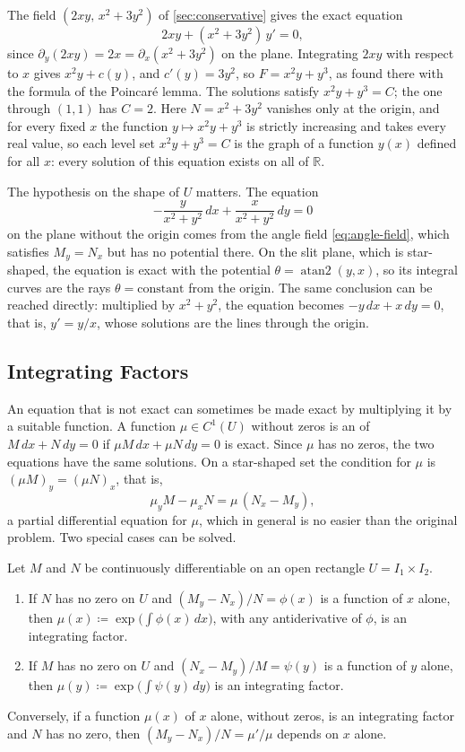 The field $(2xy,\,x^2+3y^2)$ of \cref{sec:conservative} gives the exact equation
\[
2xy+(x^2+3y^2)\,y'=0 ,
\]
since $\partial_y(2xy)=2x=\partial_x(x^2+3y^2)$ on the plane. Integrating $2xy$ with respect to $x$ gives $x^2y+c(y)$, and $c'(y)=3y^2$, so $F=x^2y+y^3$, as found there with the formula of the Poincar\'e lemma. The solutions satisfy $x^2y+y^3=C$; the one through $(1,1)$ has $C=2$. Here $N=x^2+3y^2$ vanishes only at the origin, and for every fixed $x$ the function $y\mapsto x^2y+y^3$ is strictly increasing and takes every real value, so each level set $x^2y+y^3=C$ is the graph of a function $y(x)$ defined for all $x$: every solution of this equation exists on all of $\mathbb R$.

The hypothesis on the shape of $U$ matters. The equation
\[
-\frac y{x^2+y^2}\,dx+\frac x{x^2+y^2}\,dy=0
\]
on the plane without the origin comes from the angle field \eqref{eq:angle-field}, which satisfies $M_y=N_x$ but has no potential there. On the slit plane, which is star-shaped, the equation is exact with the potential $\theta=\operatorname{atan2}(y,x)$, so its integral curves are the rays $\theta=\text{constant}$ from the origin. The same conclusion can be reached directly: multiplied by $x^2+y^2$, the equation becomes $-y\,dx+x\,dy=0$, that is, $y'=y/x$, whose solutions are the lines through the origin.

\subsection{Integrating Factors}

An equation that is not exact can sometimes be made exact by multiplying it by a suitable function. A function $\mu\in C^1(U)$ without zeros is an  of $M\,dx+N\,dy=0$ if $\mu M\,dx+\mu N\,dy=0$ is exact. Since $\mu$ has no zeros, the two equations have the same solutions. On a star-shaped set the condition for $\mu$ is $(\mu M)_y=(\mu N)_x$, that is,
\[
\mu_yM-\mu_xN=\mu\,(N_x-M_y),
\]
a partial differential equation for $\mu$, which in general is no easier than the original problem. Two special cases can be solved.

\begin{proposition}
\label{prop:integrating-factor}
Let $M$ and $N$ be continuously differentiable on an open rectangle $U=I_1\times I_2$.
\begin{enumerate}
\item If $N$ has no zero on $U$ and $(M_y-N_x)/N=\phi(x)$ is a function of $x$ alone, then $\mu(x)\coloneqq\exp\bigl(\int\phi(x)\,dx\bigr)$, with any antiderivative of $\phi$, is an integrating factor.
\item If $M$ has no zero on $U$ and $(N_x-M_y)/M=\psi(y)$ is a function of $y$ alone, then $\mu(y)\coloneqq\exp\bigl(\int\psi(y)\,dy\bigr)$ is an integrating factor.
\end{enumerate}
Conversely, if a function $\mu(x)$ of $x$ alone, without zeros, is an integrating factor and $N$ has no zero, then $(M_y-N_x)/N=\mu'/\mu$ depends on $x$ alone.
\end{proposition}

